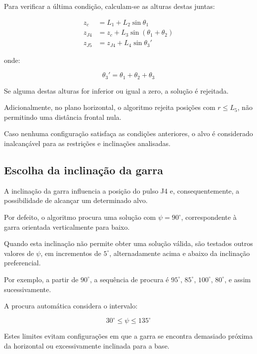 Para verificar a última condição, calculam-se as alturas destas juntas:

\begin{align}
    z_c &= L_1+L_2\sin\theta_1\\
    z_{J4} &= z_c+
    L_3\sin(\theta_1+\theta_2)\\
    z_{J5} &= z_{J4}+
    L_4\sin\theta_3'
\end{align}

onde:

\begin{equation}
    \theta_3'=\theta_1+\theta_2+\theta_3
\end{equation}

Se alguma destas alturas for inferior ou igual a zero, a solução é rejeitada.

Adicionalmente, no plano horizontal, o algoritmo rejeita posições com $r\leq L_5$, não permitindo uma distância frontal nula.

Caso nenhuma configuração satisfaça as condições anteriores, o alvo é considerado inalcançável para as restrições e inclinações analisadas.

\subsection{Escolha da inclinação da garra}

A inclinação da garra influencia a posição do pulso J4 e, consequentemente, a possibilidade de alcançar um determinado alvo.

Por defeito, o algoritmo procura uma solução com $\psi=90^\circ$, correspondente à garra orientada verticalmente para baixo.

Quando esta inclinação não permite obter uma solução válida, são testados outros valores de $\psi$, em incrementos de $5^\circ$, alternadamente acima e abaixo da inclinação preferencial.

Por exemplo, a partir de $90^\circ$, a sequência de procura é $95^\circ$, $85^\circ$, $100^\circ$, $80^\circ$, e assim sucessivamente.

A procura automática considera o intervalo:

\begin{equation}
    30^\circ\leq\psi\leq135^\circ
\end{equation}

Estes limites evitam configurações em que a garra se encontra demasiado próxima da horizontal ou excessivamente inclinada para a base.

